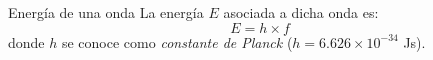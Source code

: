 \begin{infocard}{Energía de una onda}%
    La energía $E$ asociada a dicha onda es:
    \begin{equation}
        E=h \times f
    \end{equation}
    donde $h$ se conoce como \emph{constante de Planck} ($h=6.626 \times 10^{-34}$ Js).
\end{infocard}%